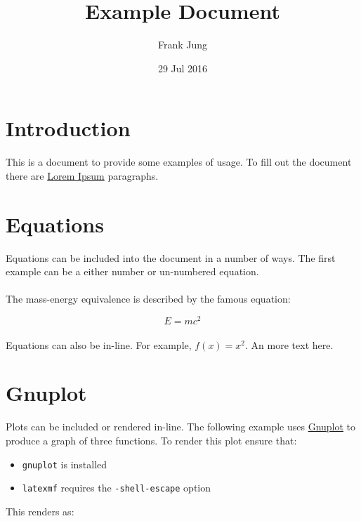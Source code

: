 \documentclass[11pt,a4paper]{article}
\title{\LaTeXe{} Example Document}
\author{Frank Jung}
\date{29 Jul 2016}
\begin{document}
\maketitle
\newpage

\tableofcontents{}
\listoffigures
\newpage

\newpage

\newcommand{\sectionbreak}{\clearpage}

\section*{Introduction}

This is a \LaTeXe{} document to provide some examples of usage. To fill out the
document there are \href{http://www.lipsum.com/}{Lorem Ipsum} paragraphs.

\lipsum[1]

\sectionbreak{}

\section*{Equations}

Equations can be included into the document in a number of ways. The first
example can be a either number or un-numbered equation.

\paragraph{}
The mass-energy equivalence is described by the famous equation:

\begin{equation}
    E = mc^2
\end{equation}

\paragraph{}
Equations can also be in-line. For example, $f(x) = x^2$. An more text here.
\lipsum[2]

\sectionbreak{}

\section*{Gnuplot}

Plots can be included or rendered in-line. The following example uses
\href{http://www.gnuplot.info/}{Gnuplot} to produce a graph of three functions.
To render this plot ensure that:
\begin{itemize}
  \item \texttt{gnuplot} is installed
  \item \texttt{latexmf} requires the \texttt{-shell-escape} option
\end{itemize}
This renders as:
\end{document}
